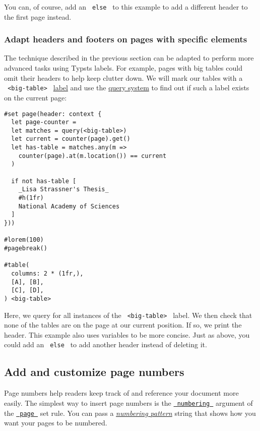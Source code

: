 You can, of course, add an \texttt{\ else\ } to this example to add a
different header to the first page instead.

\subsubsection{Adapt headers and footers on pages with specific
elements}\label{specific-elements}

The technique described in the previous section can be adapted to
perform more advanced tasks using Typst\textquotesingle s labels. For
example, pages with big tables could omit their headers to help keep
clutter down. We will mark our tables with a
\texttt{\ \textless{}big-table\textgreater{}\ }
\href{/docs/reference/foundations/label/}{label} and use the
\href{/docs/reference/introspection/query/}{query system} to find out if
such a label exists on the current page:

\begin{verbatim}
#set page(header: context {
  let page-counter =
  let matches = query(<big-table>)
  let current = counter(page).get()
  let has-table = matches.any(m =>
    counter(page).at(m.location()) == current
  )

  if not has-table [
    _Lisa Strassner's Thesis_
    #h(1fr)
    National Academy of Sciences
  ]
}))

#lorem(100)
#pagebreak()

#table(
  columns: 2 * (1fr,),
  [A], [B],
  [C], [D],
) <big-table>
\end{verbatim}

Here, we query for all instances of the
\texttt{\ \textless{}big-table\textgreater{}\ } label. We then check
that none of the tables are on the page at our current position. If so,
we print the header. This example also uses variables to be more
concise. Just as above, you could add an \texttt{\ else\ } to add
another header instead of deleting it.

\subsection{Add and customize page numbers}\label{page-numbers}

Page numbers help readers keep track of and reference your document more
easily. The simplest way to insert page numbers is the
\href{/docs/reference/layout/page/\#parameters-numbering}{\texttt{\ numbering\ }}
argument of the \href{/docs/reference/layout/page/}{\texttt{\ page\ }}
set rule. You can pass a
\href{/docs/reference/model/numbering/\#parameters-numbering}{\emph{numbering
pattern}} string that shows how you want your pages to be numbered.

